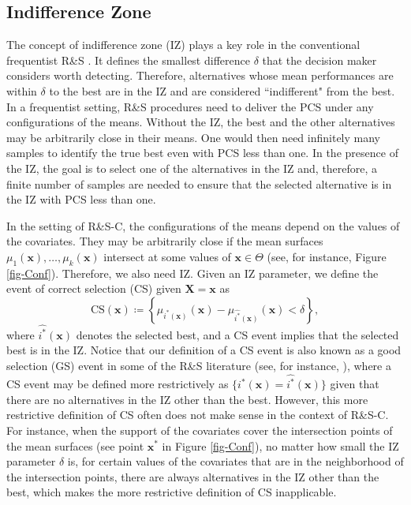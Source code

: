 \documentclass[ijoc,nonblindrev]{informs3}
\def\bx{{\bm x}}
\def\bX{{\bm X}}
\begin{document}
\subsection{Indifference Zone}

The concept of indifference zone (IZ) plays a key role in the conventional frequentist R\&S \citep{Bechhofer54}.
It defines the smallest difference $\delta$ that the decision maker considers worth detecting.
Therefore, alternatives whose mean performances are within $\delta$ to the best are in the IZ and are considered ``indifferent" from the best.
In a frequentist setting, R\&S procedures need to deliver the PCS under any configurations of the means.
Without the IZ, the best and the other alternatives may be arbitrarily close in their means. One would then need infinitely many samples to identify the true best
even with PCS less than one.
In the presence of the IZ, the goal is to select one of the alternatives in the IZ and, therefore,
a finite number of samples are needed to ensure that the selected alternative is in the IZ with PCS less than one.


In the setting of R\&S-C, the configurations of the means depend on the values of the covariates.
They may be arbitrarily close if the mean surfaces $\mu_1(\bx),\ldots,\mu_k(\bx)$ intersect at some values of $\bx\in\Theta$ (see, for instance, Figure \ref{fig-Conf}).
Therefore, we also need IZ.
Given an IZ parameter, we define the event of correct selection (CS) given $\bX=\bx$ as
\[
\mbox{CS}(\bx)\coloneqq \left\{ \mu_{i^*(\bx)}(\bx) - \mu_{\widehat{i^*}(\bx)}(\bx)  < \delta \right\},
\]
where $\widehat{i^*}(\bx)$ denotes the selected best, and a CS event implies that the selected best is in the IZ.
Notice that our definition of a CS event is also known as a good selection (GS) event in some of the R\&S literature (see, for instance, \cite{ni2017efficient}),
where a CS event may be defined more restrictively as $\{i^*(\bx) = \widehat{i^*}(\bx)\}$ given that there are no alternatives in the IZ other than the best.
However, this more restrictive definition of CS often does not make sense in the context of R\&S-C.
For instance, when the support of the covariates cover the intersection points of the mean surfaces (see point $\bx^*$ in Figure \ref{fig-Conf}), no matter how small the IZ parameter $\delta$ is,
for certain values of the covariates that are in the neighborhood of the intersection points, there are always alternatives in the IZ other than the best, which makes the more restrictive definition of CS inapplicable.
\end{document}
